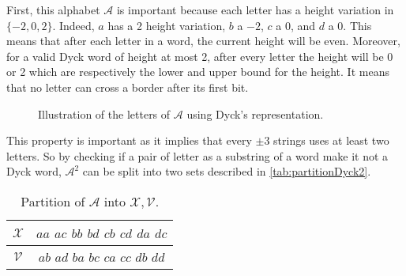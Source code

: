 \begin{tproof}
    First, this alphabet $\mathcal{A}$ is important because each letter has a height variation
    in $\{-2, 0, 2\}$. Indeed, $a$ has a 2 height variation, $b$ a $-2$, $c$ a 0, and $d$ a 0.
    This means that after each letter in a word, the current height will be even. Moreover,
    for a valid Dyck word of height at most 2, after every letter the height will be 0 or 2
    which are respectively the lower and upper bound for the height. It means that no letter
    can cross a border after its first bit.

    \begin{figure}[h!]
        \centering
        \caption{Illustration of the letters of $\mathcal{A}$ using Dyck's representation.}
        \label{tikz:dyck2alphabet}
    \end{figure}

    This property is important as it implies that every $\pm 3$ strings uses at least two letters.
    So by checking if a pair of letter as a substring of a word make it not a Dyck word, $\mathcal{A}^2$
    can be split into two sets described in \autoref{tab:partitionDyck2}.

    \begin{table}[htb]
        \centering
        \caption{Partition of $\mathcal{A}$ into $\mathcal{X}, \mathcal{V}$.}
        \label{tab:partitionDyck2}
        \begin{tabular}{|c|c|}
            \hline
            $\mathcal{X}$ & $aa$ $ac$ $bb$ $bd$ $cb$ $cd$ $da$ $dc$ \\
            \hline
            $\mathcal{V}$ & $ab$ $ad$ $ba$ $bc$ $ca$ $cc$ $db$ $dd$ \\
            \hline
        \end{tabular}



\end{table}
\end{tproof}
